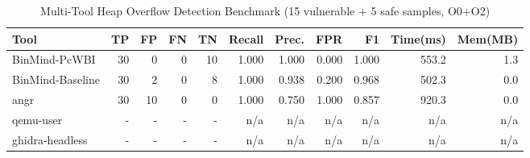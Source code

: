 \begin{table}[h]
\centering
\caption{Multi-Tool Heap Overflow Detection Benchmark (15 vulnerable + 5 safe samples, O0+O2)}
\label{tab:heap_benchmark}
\begin{tabular}{lrrrrrrrrrr}
\toprule
Tool & TP & FP & FN & TN & Recall & Prec. & FPR & F1 & Time(ms) & Mem(MB) \\
\midrule
BinMind-PcWBI & 30 & 0 & 0 & 10 & 1.000 & 1.000 & 0.000 & 1.000 & 553.2 & 1.3 \\
BinMind-Baseline & 30 & 2 & 0 & 8 & 1.000 & 0.938 & 0.200 & 0.968 & 502.3 & 0.0 \\
angr & 30 & 10 & 0 & 0 & 1.000 & 0.750 & 1.000 & 0.857 & 920.3 & 0.0 \\
qemu-user & - & - & - & - & n/a & n/a & n/a & n/a & n/a & n/a \\
ghidra-headless & - & - & - & - & n/a & n/a & n/a & n/a & n/a & n/a \\
\bottomrule
\end{tabular}
\end{table}